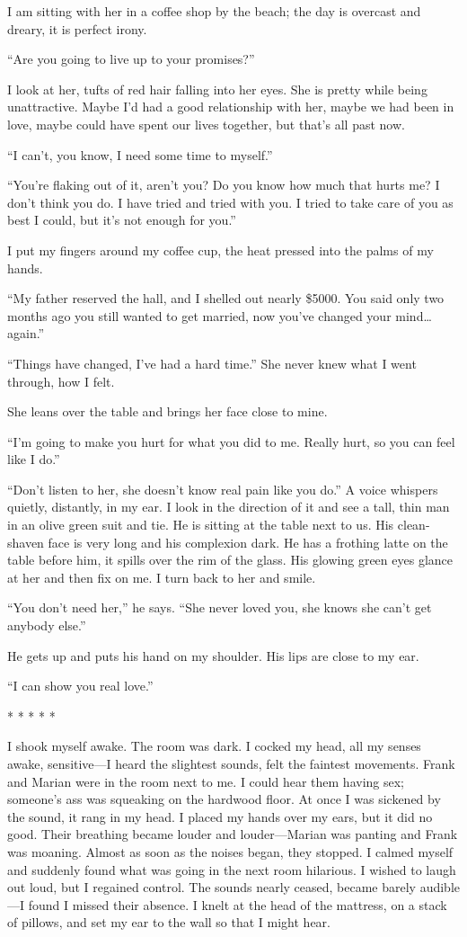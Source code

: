 \documentclass[
]{article}
\begin{document}
I am sitting with her in a coffee shop by the beach; the day is overcast
and dreary, it is perfect irony.

``Are you going to live up to your promises?''

I look at her, tufts of red hair falling into her eyes. She is pretty
while being unattractive. Maybe I'd had a good relationship with her,
maybe we had been in love, maybe could have spent our lives together,
but that's all past now.

``I can't, you know, I need some time to myself.''

``You're flaking out of it, aren't you? Do you know how much that hurts
me? I don't think you do. I have tried and tried with you. I tried to
take care of you as best I could, but it's not enough for you.''

I put my fingers around my coffee cup, the heat pressed into the palms
of my hands.

``My father reserved the hall, and I shelled out nearly \$5000. You said
only two months ago you still wanted to get married, now you've changed
your mind\ldots again.''

``Things have changed, I've had a hard time.'' She never knew what I
went through, how I felt.

She leans over the table and brings her face close to mine.

``I'm going to make you hurt for what you did to me. Really hurt, so you
can feel like I do.''

``Don't listen to her, she doesn't know real pain like you do.'' A voice
whispers quietly, distantly, in my ear. I look in the direction of it
and see a tall, thin man in an olive green suit and tie. He is sitting
at the table next to us. His clean-shaven face is very long and his
complexion dark. He has a frothing latte on the table before him, it
spills over the rim of the glass. His glowing green eyes glance at her
and then fix on me. I turn back to her and smile.

``You don't need her,'' he says. ``She never loved you, she knows she
can't get anybody else.''

He gets up and puts his hand on my shoulder. His lips are close to my
ear.

``I can show you real love.''

* * * * *

I shook myself awake. The room was dark. I cocked my head, all my senses
awake, sensitive---I heard the slightest sounds, felt the faintest
movements. Frank and Marian were in the room next to me. I could hear
them having sex; someone's ass was squeaking on the hardwood floor. At
once I was sickened by the sound, it rang in my head. I placed my hands
over my ears, but it did no good. Their breathing became louder and
louder---Marian was panting and Frank was moaning. Almost as soon as the
noises began, they stopped. I calmed myself and suddenly found what was
going in the next room hilarious. I wished to laugh out loud, but I
regained control. The sounds nearly ceased, became barely audible---I
found I missed their absence. I knelt at the head of the mattress, on a
stack of pillows, and set my ear to the wall so that I might hear.
\end{document}
